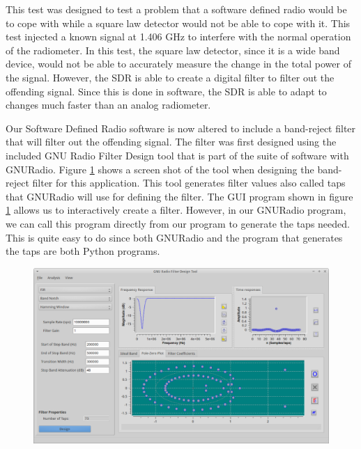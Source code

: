 This test was designed to test a problem that a software defined radio would be to cope with while a square law detector would not be able to cope with it.  This test injected a known signal at 1.406 GHz to interfere with the normal operation of the radiometer.  In this test, the square law detector, since it is a wide band device, would not be able to accurately measure the change in the total power of the signal.  However, the SDR is able to create a digital filter to filter out the offending signal.  Since this is done in software, the SDR is able to adapt to changes much faster than an analog radiometer.

Our Software Defined Radio software is now altered to include a band-reject filter that will filter out the offending signal.  The filter was first designed using the included GNU Radio Filter Design tool that is part of the suite of software with GNURadio.  Figure \ref{GRC_Filter_DSN} shows a screen shot of the tool when designing the band-reject filter for this application.  This tool generates filter values also called taps that GNURadio will use for defining the filter.  The GUI program shown in figure \ref{GRC_Filter_DSN} allows us to interactively create a filter.  However, in our GNURadio program, we can call this program directly from our program to generate the taps needed.  This is quite easy to do since both GNURadio and the program that generates the taps are both Python programs.  

\begin{figure}[h!tb] \centering

\includegraphics[width=\textwidth]{Images/GNURadio_Filter_dsn.png}
\label{GRC_Filter_DSN}
\end{figure}  

